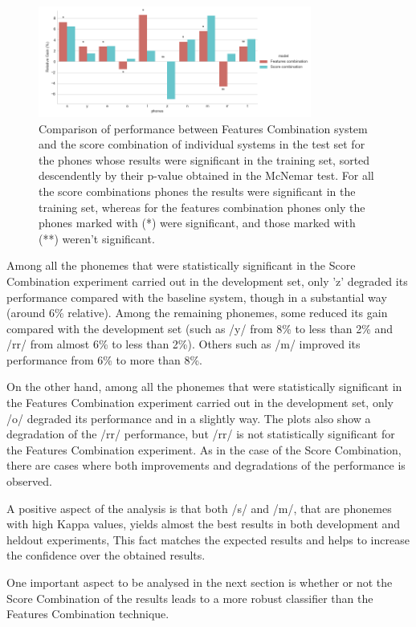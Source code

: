 \begin{figure}[H]
	\centering
	\includegraphics[width=0.8\textwidth]{files/figures/results/relatives/relative-fusion-systems-heldout-mcnemar.png}
	\caption{Comparison of performance between Features Combination system and the score combination
	of individual systems in the test set for the phones whose results were significant
	in the training set, sorted descendently by their p-value obtained in the McNemar test.
	For all the score combinations phones the results were significant in the training set,
	whereas for the features combination phones only the phones marked with (*) were significant,
	and those marked with (**) weren't significant.}
	\label{fig:fusionMcnemarTest}
\end{figure}

Among all the phonemes that were statistically significant in the Score Combination
experiment carried out in the development set, only 'z' degraded its performance compared
with the baseline system, though in a substantial way (around 6\% relative). Among the
remaining phonemes, some reduced its gain compared with the development set (such as
/y/ from 8\% to less than 2\% and /rr/ from almost 6\% to less than 2\%). Others such
as /m/ improved its performance from 6\% to more than 8\%.

On the other hand, among all the phonemes that were statistically significant in the
Features Combination experiment carried out in the development set, only /o/ degraded
its performance and in a slightly way. The plots also show a degradation of the /rr/
performance, but /rr/ is not statistically significant for the Features Combination
experiment. As in the case of the Score Combination, there are cases where both improvements
and degradations of the performance is observed.

A positive aspect of the analysis is that both /s/ and /m/, that are phonemes with high
Kappa values, yields almost the best results in both development and heldout experiments,
This fact matches the expected results and helps to
increase the confidence over the obtained results.

One important aspect to be analysed in the next section is whether or not the Score Combination
of the results leads to a more robust classifier than the Features Combination technique.


